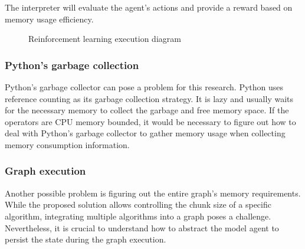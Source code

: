 The interpreter will evaluate the agent's actions and provide a reward based on memory usage efficiency.

\begin{figure}[ht]
  \caption{Reinforcement learning execution diagram}
  \label{fig:reinf-learning}
\end{figure}

\subsubsection{Python's garbage collection}

Python's garbage collector can pose a problem for this research.
Python uses reference counting as its garbage collection strategy. It is lazy and usually waits for the necessary memory to collect the garbage and free memory space.
If the operators are \ac{CPU} memory bounded, it would be necessary to figure out how to deal with Python's garbage collector to gather memory usage when collecting memory consumption information.

\subsubsection{Graph execution}

Another possible problem is figuring out the entire graph's memory requirements.
While the proposed solution allows controlling the chunk size of a specific algorithm, integrating multiple algorithms into a graph poses a challenge.
Nevertheless, it is crucial to understand how to abstract the model agent to persist the state during the graph execution.
